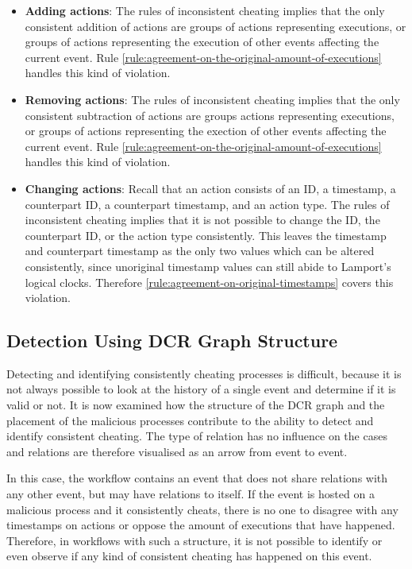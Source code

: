 	\begin{itemize}
		\item \textbf{Adding actions}: The rules of inconsistent cheating implies that the only consistent addition of actions are groups of actions representing executions, or groups of actions representing the execution of other events affecting the current event. Rule  \ref{rule:agreement-on-the-original-amount-of-executions} handles this kind of violation.
		\item \textbf{Removing actions}: The rules of inconsistent cheating implies that the only consistent subtraction of actions are groups actions representing executions, or groups of actions representing the exection of other events affecting the current event. Rule  \ref{rule:agreement-on-the-original-amount-of-executions} handles this kind of violation.
		\item \textbf{Changing actions}: Recall that an action consists of an ID, a timestamp, a counterpart ID, a counterpart timestamp, and an action type. The rules of inconsistent cheating implies that it is not possible to change the ID, the counterpart ID, or the action type consistently. This leaves the timestamp and counterpart timestamp as the only two values which can be altered consistently, since unoriginal timestamp values can still abide to Lamport's logical clocks. Therefore \autoref{rule:agreement-on-original-timestamps} covers this violation.
	\end{itemize}
	
	\subsection{Detection Using DCR Graph Structure}
	Detecting and identifying consistently cheating processes is difficult, because it is not always possible to look at the history of a single event and determine if it is valid or not. It is now examined how the structure of the DCR graph and the placement of the malicious processes contribute to the ability to detect and identify consistent cheating. The type of relation has no influence on the cases and relations are therefore visualised as an arrow from event to event.
	
	\begin{case}
		In this case, the workflow contains an event that does not share relations with any other event, but may have relations to itself. If the event is hosted on a malicious process and it consistently cheats, there is no one to disagree with any timestamps on actions or oppose the amount of executions that have happened. Therefore, in workflows with such a structure, it is not possible to identify or even observe if any kind of consistent cheating has happened on this event. 
		\label{case:malicious-alone}
	\end{case}
	
